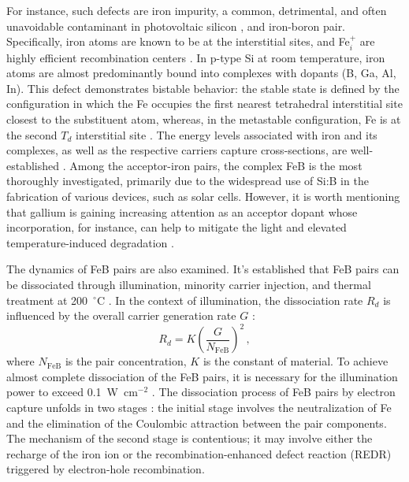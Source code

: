 \documentclass{WileyMSP-template}
\begin{document}
For instance, such defects are iron impurity, a common, detrimental, and often unavoidable contaminant
in photovoltaic silicon \cite{Frascaroli2021,Sun2021}, and iron-boron pair.
Specifically, iron atoms are known to be at the interstitial sites, and Fe$_i^+$ are highly efficient recombination centers \cite{WeberFe}.
In p-type Si at room temperature, iron atoms are almost predominantly bound into complexes with dopants (B, Ga, Al, In).
This defect demonstrates bistable behavior: the stable state is defined by the configuration in which the Fe occupies
the first nearest tetrahedral interstitial site closest to the substituent atom,
whereas, in the metastable configuration, Fe is at the second $T_d$ interstitial site \cite{FeB:PhysRevB49}.
The energy levels associated with iron and its complexes, as well as the respective carriers capture cross-sections, are well-established \cite{Juhl2018,ROUGIEUX2018}.
Among the acceptor-iron pairs, the complex FeB is the most thoroughly investigated,
primarily due to the widespread use of Si:B in the fabrication of various devices, such as solar cells.
However, it is worth mentioning that gallium is gaining increasing attention as an acceptor dopant whose incorporation,
for instance, can help to mitigate the light and elevated temperature-induced degradation \cite{Ning2022}.

The dynamics of FeB pairs are also examined.
It's established that FeB pairs can be dissociated through illumination, minority carrier injection, and thermal treatment at 200~$^\circ$C \cite{FeBAssJAP2014}.
In the context of illumination, the dissociation rate $R_d$ is influenced by the overall carrier generation rate $G$ \cite{FeBLight2,FeBAssJAP2014,FeBKin2019,FeMethod2012}:
\begin{equation}
\label{eqRd}
R_d=K\left(\frac{G}{N_\mathrm{FeB}}\right)^2\,,
\end{equation}
where
$N_\mathrm{FeB}$ is the pair concentration,
$K$ is the constant of material.
To achieve almost complete dissociation of the FeB pairs, it is necessary for the illumination power to exceed 0.1~W~cm$^{-2}$ \cite{Macdonald2004}.
The dissociation process of FeB pairs by electron capture unfolds in two stages \cite{KIMERLINGFeB,FeBAssJAP2014}:
the initial stage involves the neutralization of Fe and the elimination of the Coulombic attraction between the pair components.
The mechanism of the second stage is contentious; it may involve either the recharge of the iron ion or the recombination-enhanced defect reaction
(REDR) triggered by electron-hole recombination.
\end{document}
